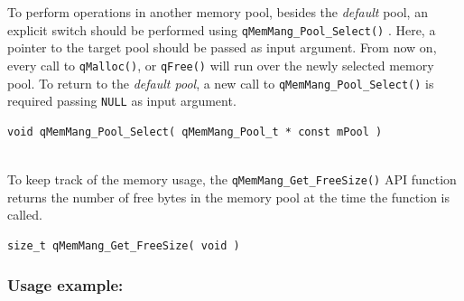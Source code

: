 \documentclass{article}
\begin{document}
To perform operations in another memory pool, besides the \textit{default} pool, an explicit switch should be performed using \lstinline{qMemMang_Pool_Select()} . Here, a pointer to the target pool should be passed as input argument.  From now on, every call to \lstinline{qMalloc()}, or \lstinline{qFree()} will run over the newly selected memory pool. To return to  the \textit{default pool},  a new call to  \lstinline{qMemMang_Pool_Select()} is required passing \lstinline{NULL} as input argument. \\ 

\begin{lstlisting}[style=CStyle]
void qMemMang_Pool_Select( qMemMang_Pool_t * const mPool )
\end{lstlisting}

\\
To keep track of the memory usage, the \lstinline{qMemMang_Get_FreeSize()}  API function returns the number of free bytes in the memory pool at the time the function is called.
\begin{lstlisting}[style=CStyle]
size_t qMemMang_Get_FreeSize( void )
\end{lstlisting}

\subsubsection*{Usage example:}
\end{document}
